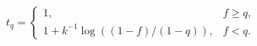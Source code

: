 \par\needspace{88pt}\begin{minipage}{\linewidth}
\begin{equation}t_q=\begin{cases}1,&f\geq q,\\1+k^{-1}\log\!\left((1-f)/(1-q)\right),&f<q.\end{cases}\label{eq:9}\end{equation}
\end{minipage}\par

